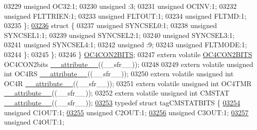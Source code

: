 \begin{DoxyCode}
03229       \textcolor{keywordtype}{unsigned} OC32:1;
03230       \textcolor{keywordtype}{unsigned} :3;
03231       \textcolor{keywordtype}{unsigned} OCINV:1;
03232       \textcolor{keywordtype}{unsigned} FLTTRIEN:1;
03233       \textcolor{keywordtype}{unsigned} FLTOUT:1;
03234       \textcolor{keywordtype}{unsigned} FLTMD:1;
03235     \};
\hypertarget{a00009_source_l03236}{}\hyperlink{a00009}{03236}     \textcolor{keyword}{struct }\{
03237       \textcolor{keywordtype}{unsigned} SYNCSEL0:1;
03238       \textcolor{keywordtype}{unsigned} SYNCSEL1:1;
03239       \textcolor{keywordtype}{unsigned} SYNCSEL2:1;
03240       \textcolor{keywordtype}{unsigned} SYNCSEL3:1;
03241       \textcolor{keywordtype}{unsigned} SYNCSEL4:1;
03242       \textcolor{keywordtype}{unsigned} :9;
03243       \textcolor{keywordtype}{unsigned} FLTMODE:1;
03244     \};
03245   \};
03246 \} \hyperlink{a00008_d3/da3/a00627}{OC4CON2BITS};
03247 \textcolor{keyword}{extern} \textcolor{keyword}{volatile} \hyperlink{a00008_d3/da3/a00627}{OC4CON2BITS} OC4CON2bits \hyperlink{a00009_a493c46f03454991ccc5aa7a6e1dfb2a7}{\_\_attribute\_\_}((\_\_sfr\_\_));
03248 
03249 \textcolor{keyword}{extern} \textcolor{keyword}{volatile} \textcolor{keywordtype}{unsigned} \textcolor{keywordtype}{int}  OC4RS \hyperlink{a00009_a493c46f03454991ccc5aa7a6e1dfb2a7}{\_\_attribute\_\_}((\_\_sfr\_\_));
03250 \textcolor{keyword}{extern} \textcolor{keyword}{volatile} \textcolor{keywordtype}{unsigned} \textcolor{keywordtype}{int}  OC4R \hyperlink{a00009_a493c46f03454991ccc5aa7a6e1dfb2a7}{\_\_attribute\_\_}((\_\_sfr\_\_));
03251 \textcolor{keyword}{extern} \textcolor{keyword}{volatile} \textcolor{keywordtype}{unsigned} \textcolor{keywordtype}{int}  OC4TMR \hyperlink{a00009_a493c46f03454991ccc5aa7a6e1dfb2a7}{\_\_attribute\_\_}((\_\_sfr\_\_));
03252 \textcolor{keyword}{extern} \textcolor{keyword}{volatile} \textcolor{keywordtype}{unsigned} \textcolor{keywordtype}{int}  CMSTAT \hyperlink{a00009_a493c46f03454991ccc5aa7a6e1dfb2a7}{\_\_attribute\_\_}((\_\_sfr\_\_));
\hypertarget{a00009_source_l03253}{}\hyperlink{a00008}{03253} \textcolor{keyword}{typedef} \textcolor{keyword}{struct }tagCMSTATBITS \{
\hypertarget{a00009_source_l03254}{}\hyperlink{a00008_ac92ec38a908579dba4576b58d83b448b}{03254}   \textcolor{keywordtype}{unsigned} C1OUT:1;
\hypertarget{a00009_source_l03255}{}\hyperlink{a00008_a97b4baf2ebfd7bb4d0a6f4be6665c7ab}{03255}   \textcolor{keywordtype}{unsigned} C2OUT:1;
\hypertarget{a00009_source_l03256}{}\hyperlink{a00008_a1168ba74c2f65affe96009728486d762}{03256}   \textcolor{keywordtype}{unsigned} C3OUT:1;
\hypertarget{a00009_source_l03257}{}\hyperlink{a00008_a0207c3cbe8e0aa0c9377a6001273e3cd}{03257}   \textcolor{keywordtype}{unsigned} C4OUT:1;

\end{DoxyCode}
